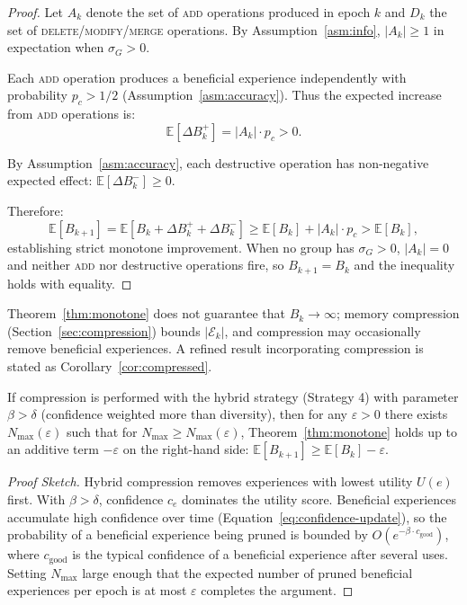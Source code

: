 \begin{proof}
Let $A_k$ denote the set of \textsc{add} operations produced in epoch $k$
and $D_k$ the set of \textsc{delete}/\textsc{modify}/\textsc{merge} operations.
By Assumption~\ref{asm:info}, $|A_k| \geq 1$ in expectation when $\sigma_G > 0$.

Each \textsc{add} operation produces a beneficial experience independently with
probability $p_c > 1/2$ (Assumption~\ref{asm:accuracy}). Thus the expected
increase from \textsc{add} operations is:
\begin{equation}
    \mathbb{E}[\Delta B_k^+] = |A_k| \cdot p_c > 0.
\end{equation}

By Assumption~\ref{asm:accuracy}, each destructive operation has non-negative
expected effect: $\mathbb{E}[\Delta B_k^-] \geq 0$.

Therefore:
\begin{equation}
    \mathbb{E}[B_{k+1}] = \mathbb{E}[B_k + \Delta B_k^+ + \Delta B_k^-]
    \geq \mathbb{E}[B_k] + |A_k| \cdot p_c > \mathbb{E}[B_k],
\end{equation}
establishing strict monotone improvement. When no group has $\sigma_G > 0$,
$|A_k| = 0$ and neither \textsc{add} nor destructive operations fire, so
$B_{k+1} = B_k$ and the inequality holds with equality.
\end{proof}

\begin{remark}
Theorem~\ref{thm:monotone} does not guarantee that $B_k \to \infty$;
memory compression (Section~\ref{sec:compression}) bounds $|\mathcal{E}_k|$,
and compression may occasionally remove beneficial experiences. A refined
result incorporating compression is stated as Corollary~\ref{cor:compressed}.
\end{remark}

\begin{corollary}
\label{cor:compressed}
If compression is performed with the hybrid strategy (Strategy 4) with
parameter $\beta > \delta$ (confidence weighted more than diversity), then
for any $\varepsilon > 0$ there exists $N_{\max}(\varepsilon)$ such that for
$N_{\max} \geq N_{\max}(\varepsilon)$, Theorem~\ref{thm:monotone} holds up
to an additive term $-\varepsilon$ on the right-hand side:
$\mathbb{E}[B_{k+1}] \geq \mathbb{E}[B_k] - \varepsilon$.
\end{corollary}

\begin{proof}[Proof Sketch]
Hybrid compression removes experiences with lowest utility $U(e)$ first. With
$\beta > \delta$, confidence $c_e$ dominates the utility score. Beneficial
experiences accumulate high confidence over time (Equation~\eqref{eq:confidence-update}),
so the probability of a beneficial experience being pruned is bounded by
$O(e^{-\beta \cdot c_{\text{good}}})$, where $c_{\text{good}}$ is the typical
confidence of a beneficial experience after several uses. Setting $N_{\max}$
large enough that the expected number of pruned beneficial experiences per
epoch is at most $\varepsilon$ completes the argument.
\end{proof}


